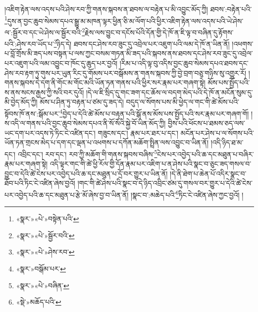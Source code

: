 །འཇིག་རྟེན་ལས་འདས་པའི་ཤེས་རབ་ཀྱི་གནས་སྐབས་ན་ཐབས་ལ་བརྟེན་པ་མི་འབྱུང་མོད་ཀྱི། ཐབས་:བརྟེན་པའི་\footnote{«སྣར་»«པེ་»བསྟེན་པའི་}དུས་ན་བྱང་ཆུབ་སེམས་དཔའ་སྒྱུ་མ་མཁན་ལྟར་ཕྱིན་ཅི་མ་ལོག་པའི་ཕྱིར་འཇིག་རྟེན་ལས་འདས་པའི་ཡེ་ཤེས་ལ་:སྦྱོར་བ་དང་ཡེ་ཤེས་ལ་སྦྱོར་བའི་\footnote{«སྣར་»«པེ་»སྦྱོར་བའི་}རྗེས་ལས་བྱུང་བ་དངོས་པོའི་དོན་གྱི་དེ་ཁོ་ན་ཇི་ལྟ་བ་བཞིན་དུ་རྟོགས་པའི་:ཤེས་རབ་ཡོད་པ་\footnote{«སྣར་»«པེ་»ཤེས་རབ་}ཉིད་དེ། ཐབས་དང་ཤེས་རབ་ཟུང་དུ་འབྲེལ་པར་འཇུག་པའི་ལམ་དེ་ཁོ་ན་ཡིན་ནོ། །འཕགས་པ་བློ་གྲོས་མི་ཟད་པས་བསྟན་པ་ལས་ཀྱང་བསམ་གཏན་མི་ཟད་པའི་སྐབས་ནས་ཐབས་དང་ཤེས་རབ་ཟུང་དུ་འབྲེལ་པར་འཇུག་པའི་ལམ་འབྱུང་བ་ཁོང་དུ་ཆུད་པར་བྱའོ། །རིམ་པ་འདི་ལྟ་བུ་འདིས་བྱང་ཆུབ་སེམས་དཔའ་ཐབས་དང་ཤེས་རབ་རྟག་ཏུ་གུས་པར་ཡུན་རིང་དུ་གོམས་པར་བསྒོམས་ན་གནས་སྐབས་ཀྱི་བྱེ་བྲག་བཅུ་གཉིས་སུ་འགྱུར་རོ། །གནས་སྐབས་དེ་དག་ནི་གོང་མ་གོང་མའི་ཡོན་ཏན་གནས་པའི་ཕྱིར་སར་རྣམ་པར་གཞག་སྟེ། མོས་པས་སྤྱོད་པའི་ས་ནས་སངས་རྒྱས་ཀྱི་སའི་བར་དུའོ། །དེ་ལ་ཇི་སྲིད་དུ་གང་ཟག་དང་ཆོས་ལ་བདག་མེད་པའི་དེ་ཁོ་ན་མངོན་སུམ་དུ་མི་བྱེད་མོད་ཀྱི། མོས་པ་ཤིན་ཏུ་བརྟན་པ་ཙམ་དུ་ཟད་དེ། བདུད་ལ་སོགས་པས་མི་ཕྱེད་ལ་གང་གི་ཚེ་མོས་པའི་སྟོབས་ཁོ་ནས་:སྒོམ་པར་\footnote{«སྣར་»བསྒོམ་པར་}བྱེད་པ་དེའི་ཚེ་མོས་པ་བརྟན་པའི་སྒོ་ནས་མོས་པས་སྤྱོད་པའི་སར་རྣམ་པར་གཞག་གོ། །ས་འདི་ལ་གནས་པའི་བྱང་ཆུབ་སེམས་དཔའ་ནི་སོ་སོའི་སྐྱེ་བོ་ཡིན་མོད་ཀྱི། བྱིས་པའི་ཕོངས་པ་ཐམས་ཅད་ལས་ཡང་དག་པར་འདས་ཏེ་ཏིང་ངེ་འཛིན་དང་། གཟུངས་དང་། རྣམ་པར་ཐར་པ་དང་། མངོན་པར་ཤེས་པ་ལ་སོགས་པའི་ཡོན་ཏན་གྲངས་མེད་པ་དག་དང་ལྡན་པ་འཕགས་པ་དཀོན་མཆོག་སྤྲིན་ལས་འབྱུང་བ་ཡིན་ནོ། །འདི་ཉིད་ཐ་མ་དང་། འབྲིང་དང་། རབ་དང་། རབ་ཀྱི་མཆོག་གི་གནས་སྐབས་བཞིས་\footnote{«སྣར་»«པེ་»བཞིན་}ངེས་པར་འབྱེད་པའི་ཆ་དང་མཐུན་པ་བཞིར་རྣམ་པར་གཞག་སྟེ། འདི་ལྟར་གང་གི་ཚེ་ཕྱི་རོལ་གྱི་དོན་རྣམ་པར་འཇིག་པ་ན་ཤེས་པའི་སྣང་བ་ཅུང་ཟད་གསལ་བ་བྱུང་བ་དེའི་ཚེ་ངེས་པར་འབྱེད་པའི་ཆ་དང་མཐུན་པ་དྲོ་བར་གྱུར་པ་ཡིན་ནོ། །དེ་ནི་ཐེག་པ་ཆེན་པོ་འདིར་སྣང་བ་ཐོབ་པའི་ཏིང་ངེ་འཛིན་ཞེས་བྱའོ། །གང་གི་ཚེ་ཤེས་པའི་སྣང་བ་དེ་ཉིད་འབྲིང་ཙམ་དུ་གསལ་བར་གྱུར་པ་དེའི་ཚེ་ངེས་པར་འབྱེད་པའི་ཆ་དང་མཐུན་པ་རྩེ་མོ་ཞེས་བྱ་བ་ཡིན་ནོ། །སྣང་བ་:མཆེད་པའི་\footnote{«སྡེ་»མཆོད་པའི་}ཏིང་ངེ་འཛིན་ཞེས་ཀྱང་བྱའོ། །
